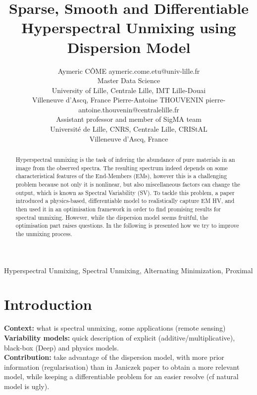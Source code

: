 \documentclass{article}
\begin{document}
\title{Sparse, Smooth and Differentiable Hyperspectral Unmixing using Dispersion Model}

\author{\name Aymeric CÔME \email aymeric.come.etu@univ-lille.fr \\
       \addr Master Data Science\\
       University of Lille, Centrale Lille, IMT Lille-Douai\\
       Villeneuve d'Ascq, France
       \AND
       \name Pierre-Antoine THOUVENIN \email pierre-antoine.thouvenin@centralelille.fr \\
       \addr Assistant professor and member of SigMA team\\
       Université de Lille, CNRS, Centrale Lille, CRIStAL\\
       Villeneuve d'Ascq, France}

\maketitle

\begin{abstract}%
  Hyperspectral unmixing is the task of infering the abundance of pure materials in an image from the observed spectra. The resulting spectrum indeed depends on some characteristical features of the End-Members (EMs), however this is a challenging problem because not only it is nonlinear, but also miscellaneous factors can change the output, which is known as Spectral Variability (SV). To tackle this problem, a paper \citep{janiczek_differentiable_2020} introduced a physics-based, differentiable model to realistically capture EM HV, and then used it in an optimisation framework in order to find promising results for spectral unmixing. However, while the dispersion model seems fruitful, the optimisation part raises questions. In the following is presented how we try to improve the unmixing process.
\end{abstract}

\begin{keywords}
Hyperspectral Unmixing, Spectral Unmixing, Alternating Minimization, Proximal
\end{keywords}

\section{Introduction}
\textbf{Context:} what is spectral unmixing, some applications (remote sensing)\\
\textbf{Variability models:} quick description of explicit (additive/multiplicative), black-box (Deep) and physics models.\\
\textbf{Contribution:} take advantage of the dispersion model, with more prior information (regularisation) than in Janiczek paper to obtain a more relevant model, while keeping a differentiable problem for an easier resolve (cf natural model is ugly).\\
\end{document}
